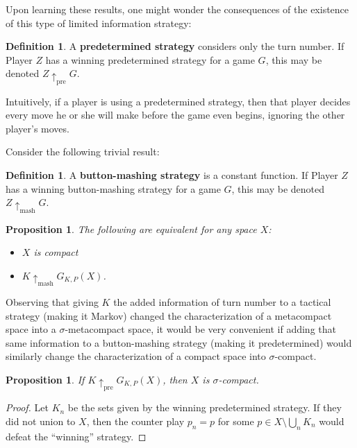 \documentclass[11pt]{article}
\theoremstyle{plain}
\newtheorem{proposition}[theorem]{Proposition}
\theoremstyle{definition}
\newtheorem{definition}[theorem]{Definition}
\theoremstyle{remark}
\newcommand{\prewin}{\uparrow_{\text{pre}}}
\begin{document}
Upon learning these results, one might wonder the consequences of the existence of this type of limited information strategy:

\begin{definition}
A \textbf{predetermined strategy} considers only the turn number. If Player $Z$ has a winning predetermined strategy for a game $G$, this may be denoted $Z \prewin G$.
\end{definition}

Intuitively, if a player is using a predetermined strategy, then that player decides every move he or she will make before the game even begins, ignoring the other player's moves.

Consider the following trivial result:

\begin{definition}
A \textbf{button-mashing strategy} is a constant function. If Player $Z$ has a winning button-mashing strategy for a game $G$, this may be denoted $Z \uparrow_{\text{mash}} G$.
\end{definition}

\begin{proposition}
The following are equivalent for any space $X$:
    \begin{itemize}
    \item $X$ is compact
    \item $K \uparrow_{\text{mash}}G_{K,P}(X)$.
    \end{itemize}
\end{proposition}

Observing that giving $K$ the added information of turn number to a tactical strategy (making it Markov) changed the characterization of a metacompact space into a $\sigma$-metacompact space, it would be very convenient if adding that same information to a button-mashing strategy (making it predetermined) would similarly change the characterization of a compact space into $\sigma$-compact.

\begin{proposition}
If $K \prewin G_{K,P}(X)$, then $X$ is $\sigma$-compact.
\end{proposition}

\begin{proof}
Let $K_n$ be the sets given by the winning predetermined strategy. If they did not union to $X$, then the counter play $p_n=p$ for some $p\in X\setminus \bigcup_n K_n$ would defeat the ``winning'' strategy.
\end{proof}
\end{document}
